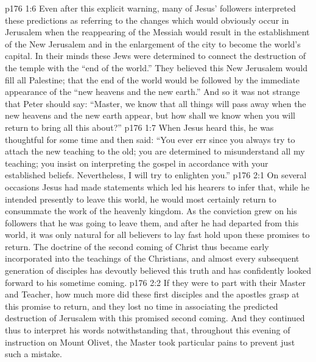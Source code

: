 \vs p176 1:6 Even after this explicit warning, many of Jesus’ followers interpreted these predictions as referring to the changes which would obviously occur in Jerusalem when the reappearing of the Messiah would result in the establishment of the New Jerusalem and in the enlargement of the city to become the world’s capital. In their minds these Jews were determined to connect the destruction of the temple with the “end of the world.” They believed this New Jerusalem would fill all Palestine; that the end of the world would be followed by the immediate appearance of the “new heavens and the new earth.” And so it was not strange that Peter should say: “Master, we know that all things will pass away when the new heavens and the new earth appear, but how shall we know when you will return to bring all this about?”
\vs p176 1:7 When Jesus heard this, he was thoughtful for some time and then said: \textcolor{ubdarkred}{“You ever err since you always try to attach the new teaching to the old; you are determined to misunderstand all my teaching; you insist on interpreting the gospel in accordance with your established beliefs. Nevertheless, I will try to enlighten you.”}
\vs p176 2:1 On several occasions Jesus had made statements which led his hearers to infer that, while he intended presently to leave this world, he would most certainly return to consummate the work of the heavenly kingdom. As the conviction grew on his followers that he was going to leave them, and after he had departed from this world, it was only natural for all believers to lay fast hold upon these promises to return. The doctrine of the second coming of Christ thus became early incorporated into the teachings of the Christians, and almost every subsequent generation of disciples has devoutly believed this truth and has confidently looked forward to his sometime coming.
\vs p176 2:2 If they were to part with their Master and Teacher, how much more did these first disciples and the apostles grasp at this promise to return, and they lost no time in associating the predicted destruction of Jerusalem with this promised second coming. And they continued thus to interpret his words notwithstanding that, throughout this evening of instruction on Mount Olivet, the Master took particular pains to prevent just such a mistake.
